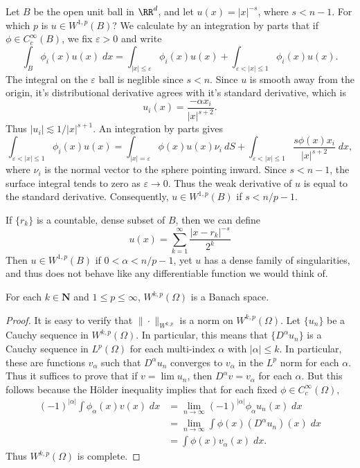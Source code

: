 \begin{example}
  Let $B$ be the open unit ball in $\RR^d$, and let $u(x) = |x|^{-s}$, where $s < n-1$. For which $p$ is $u \in W^{1,p}(B)$? We calculate by an integration by parts that if $\phi \in C_c^\infty(B)$, we fix $\varepsilon > 0$ and write
  \[ \int_B \phi_i(x) u(x)\; dx = \int_{|x| \leq \varepsilon} \phi_i(x) u(x) + \int_{\varepsilon < |x| \leq 1} \phi_i(x) u(x). \]
  The integral on the $\varepsilon$ ball is neglible since $s < n$. Since $u$ is smooth away from the origin, it's distributional derivative agrees with it's standard derivative, which is
  \[ u_i(x) = \frac{- \alpha x_i}{|x|^{s + 2}}. \]
  Thus $|u_i| \lesssim 1/|x|^{s + 1}$. An integration by parts gives
  \[ \int_{\varepsilon < |x| \leq 1} \phi_i(x) u(x) = \int_{|x| = \varepsilon} \phi(x) u(x) \nu_i\ dS + \int_{\varepsilon < |x| \leq 1} \frac{s \phi(x) x_i}{|x|^{s + 2}}\; dx, \]
  where $\nu_i$ is the normal vector to the sphere pointing inward. Since $s < n-1$, the surface integral tends to zero as $\varepsilon \to 0$. Thus the weak derivative of $u$ is equal to the standard derivative. Consequently, $u \in W^{1,p}(B)$ if $s < n/p - 1$.
\end{example}

\begin{example}
  If $\{ r_k \}$ is a countable, dense subset of $B$, then we can define
  \[ u(x) = \sum_{k = 1}^\infty \frac{|x - r_k|^{-s}}{2^k} \]
  Then $u \in W^{1,p}(B)$ if $0 < \alpha < n/p - 1$, yet $u$ has a dense family of singularities, and thus does not behave like any differentiable function we would think of.
\end{example}

\begin{theorem}
  For each $k \in \mathbf{N}$ and $1 \leq p \leq \infty$, $W^{k,p}(\Omega)$ is a Banach space.
\end{theorem}
\begin{proof}
  It is easy to verify that $\| \cdot \|_{W^{k,p}}$ is a norm on $W^{k,p}(\Omega)$. Let $\{ u_n \}$ be a Cauchy sequence in $W^{k,p}(\Omega)$. In particular, this means that $\{ D^\alpha u_n \}$ is a Cauchy sequence in $L^p(\Omega)$ for each multi-index $\alpha$ with $|\alpha| \leq k$. In particular, these are functions $v_\alpha$ such that $D^\alpha u_n$ converges to $v_\alpha$ in the $L^p$ norm for each $\alpha$. Thus it suffices to prove that if $v = \lim u_n$, then $D^\alpha v = v_\alpha$ for each $\alpha$. But this follows because the H\"{o}lder inequality implies that for each fixed $\phi \in C_c^\infty(\Omega)$,
  \begin{align*}
    (-1)^{|\alpha|} \int \phi_\alpha(x) v(x)\; dx &= \lim_{n \to \infty} (-1)^{|\alpha|} \phi_\alpha u_n(x)\; dx\\
    &= \lim_{n \to \infty} \int \phi(x) (D^\alpha u_n)(x)\; dx\\
    &= \int \phi(x) v_\alpha(x)\; dx.
  \end{align*}
  Thus $W^{k,p}(\Omega)$ is complete.
\end{proof}

